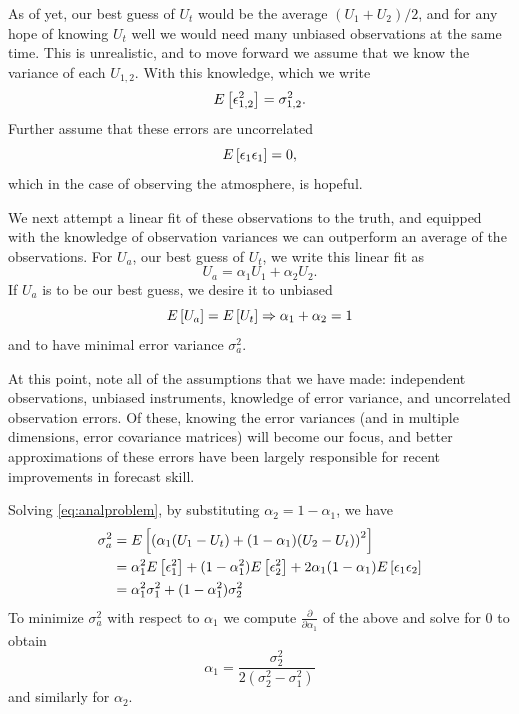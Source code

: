 \documentclass[12pt]{report}
\begin{document}
As of yet, our best guess of $U_t$ would be the average $(U_1 + U_2)/2$, and for any hope of knowing $U_t$ well we would need many unbiased observations at the same time.
This is unrealistic, and to move forward we assume that we know the variance of each $U_{1,2}$.
With this knowledge, which we write
\begin{equation} E \left [ \epsilon _{1,2} ^2 \right ] = \sigma _{1,2} ^2 .\end{equation}
Further assume that these errors are uncorrelated
\begin{equation} E \left [ \epsilon _1 \epsilon _1 \right ] = 0, \end{equation}
which in the case of observing the atmosphere, is hopeful.

We next attempt a linear fit of these observations to the truth, and equipped with the knowledge of observation variances we can outperform an average of the observations.
For $U_a$, our best guess of $U_t$, we write this linear fit as
\begin{equation} U_a = \alpha _1 U_1 + \alpha _2 U_2 \label{eq:analproblem}. \end{equation}
If $U_a$ is to be our best guess, we desire it to unbiased
\begin{equation*} E \left [ U_a \right ] = E \left [ U_t \right ] \Rightarrow \alpha _1 + \alpha _2 = 1\end{equation*}
and to have minimal error variance $\sigma _a ^2$.

At this point, note all of the assumptions that we have made: independent observations, unbiased instruments, knowledge of error variance, and uncorrelated observation errors.
Of these, knowing the error variances (and in multiple dimensions, error covariance matrices) will become our focus, and better approximations of these errors have been largely responsible for recent improvements in forecast skill.

Solving \ref{eq:analproblem}, by substituting $\alpha _2 = 1 - \alpha _1$, we have
\begin{align*} \sigma _a ^2 &= E \left [  \left ( \alpha_1 (U_1-U_t)+(1-\alpha_1)(U_2 - U_t) \right ) ^2  \right ] \\
&= \alpha_1^2  E \left [  \epsilon _1 ^2  \right ] + (1-\alpha _1^2) E \left [  \epsilon _2 ^2 \right ] + 2\alpha _1 (1- \alpha _1) E \left [ \epsilon _1 \epsilon _2 \right ] \\
&=\alpha _1 ^2 \sigma_1 ^2 + (1-\alpha _1 ^2) \sigma _2^2\end{align*}
To minimize $\sigma _a^2$ with respect to $\alpha _1$ we compute $\frac{\partial }{\partial \alpha _1}$ of the above and solve for 0 to obtain
$$ \alpha _1 = \frac{\sigma _2 ^2}{2(\sigma_2^2 - \sigma _1^2)} $$
and similarly for $\alpha _2$.
\end{document}
